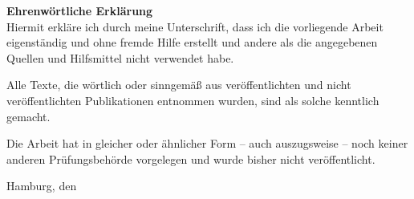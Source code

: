 \fontsize{14pt}{16pt}\selectfont
{\textbf{Ehrenwörtliche Erklärung}}\\
\normalsize
Hiermit erkläre ich durch meine Unterschrift, dass ich die vorliegende Arbeit eigenständig und ohne fremde Hilfe erstellt und andere als die angegebenen Quellen und Hilfsmittel nicht verwendet habe.

\linespread{1.25}
\noindent Alle Texte, die wörtlich oder sinngemäß aus veröffentlichten und nicht veröffentlichten Publikationen entnommen wurden, sind als solche kenntlich gemacht.

\linespread{1.25}
\noindent Die Arbeit hat in gleicher oder ähnlicher Form – auch auszugsweise – noch keiner anderen Prüfungsbehörde vorgelegen und wurde bisher nicht veröffentlicht.
\vspace{0.5cm}

\noindent
\studentname

\vspace{1cm}
\noindent
Hamburg, den \abgabetag\\

\newpage
